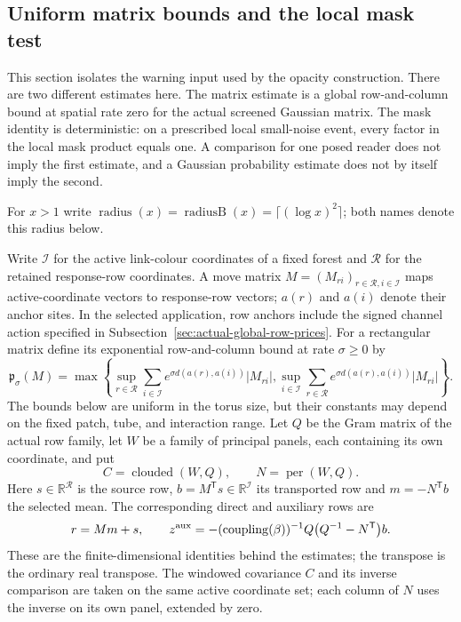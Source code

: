\subsection{Uniform matrix bounds and the local mask test}
\label{sec:actual-palette-warning}

This section isolates the warning input used by the opacity construction.
There are two different estimates here. The matrix estimate is a global
row-and-column bound at spatial rate zero for the actual screened Gaussian
matrix. The mask identity is deterministic: on a prescribed local
small-noise event, every factor in the local mask product equals one. A
comparison for one posed reader does not imply the first estimate, and a
Gaussian probability estimate does not by itself imply the second.

For $x>1$ write
$\operatorname{radius}(x)=\operatorname{radiusB}(x)=\lceil(\log x)^2\rceil$;
both names denote this radius below.

Write $\mathcal I$ for the active link-colour coordinates of a fixed forest
and $\mathcal R$ for the retained response-row coordinates. A move matrix
$M=(M_{ri})_{r\in\mathcal R,i\in\mathcal I}$ maps active-coordinate
vectors to response-row vectors; $a(r)$ and $a(i)$ denote their anchor
sites. In the selected application, row anchors include the signed
channel action specified in Subsection~\ref{sec:actual-global-row-prices}.
For a rectangular matrix define its exponential row-and-column bound
at rate $\sigma\geq0$ by
\[
 \mathfrak p_\sigma(M)=\max\left\{
   \sup_{r\in\mathcal R}\sum_{i\in\mathcal I}
       e^{\sigma d(a(r),a(i))}|M_{ri}|,
   \sup_{i\in\mathcal I}\sum_{r\in\mathcal R}
       e^{\sigma d(a(r),a(i))}|M_{ri}|\right\}.
\]
The bounds below are uniform in the torus size, but their constants may
depend on the fixed patch, tube, and interaction range. Let $Q$ be the Gram
matrix of the actual row family, let $W$ be a family of principal panels, each containing its own
coordinate, and put
\[
 C=\operatorname{clouded}(W,Q),\qquad N=\operatorname{per}(W,Q).
\]
Here $s\in\mathbb R^{\mathcal R}$ is the source row,
$b=M^{\mathsf T}s\in\mathbb R^{\mathcal I}$ its transported row and
$m=-N^{\mathsf T}b$ the selected mean. The corresponding direct and
auxiliary rows are
\[
 r=Mm+s,\qquad
z^{\rm aux}=-(\operatorname{coupling}(\beta))^{-1}
       Q\bigl(Q^{-1}-N^{\mathsf T}\bigr)b.
\]
These are the finite-dimensional identities behind the estimates; the
transpose is the ordinary real transpose. The windowed covariance $C$ and
its inverse comparison are taken on the same active coordinate set; each
column of $N$ uses the inverse on its own panel, extended by zero.

